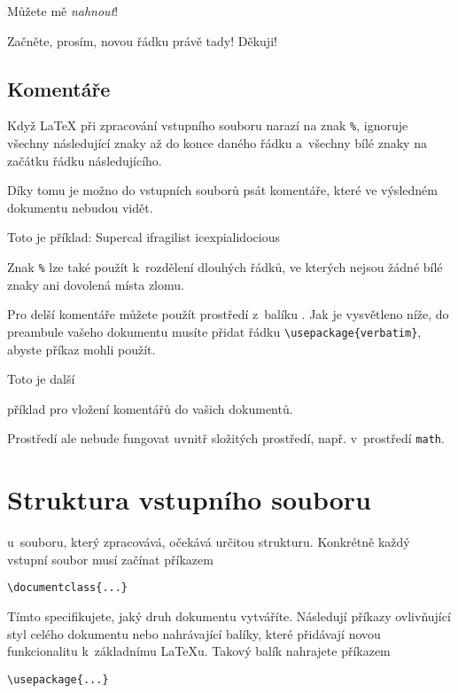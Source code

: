 \begin{example}
Můžete mě \textsl{nahnout}!
\end{example}
\begin{example}
Začněte, prosím, novou řádku
právě tady!\newline
Děkuji!
\end{example}

\subsection{Komentáře}

Když \LaTeX{} při zpracování vstupního souboru narazí na znak \verb|%|,
ignoruje všechny následující znaky až do konce daného řádku
a~všechny bílé znaky na začátku řádku následujícího.

Díky tomu je možno do vstupních souborů psát komentáře, které ve výsledném
dokumentu nebudou vidět.

\begin{example}
Toto je %
příklad: Supercal%
              ifragilist%
    icexpialidocious
\end{example}

Znak \texttt{\%} lze také použít k~rozdělení dlouhých řádků, ve kterých
nejsou žádné bílé znaky ani dovolená místa zlomu.

Pro delší komentáře můžete použít prostředí  z~balíku
. Jak je vysvětleno níže, do preambule vašeho dokumentu 
musíte přidat řádku \verb|\usepackage{verbatim}|, abyste příkaz 
mohli použít.

\begin{example}
Toto je další
\begin{comment}
celkem stupidní,
ale přesto užitečný
\end{comment}
příklad pro vložení
komentářů do vašich dokumentů.
\end{example}

Prostředí  ale nebude fungovat uvnitř složitých prostředí, např. v~prostředí \verb|math|.

\section{Struktura vstupního souboru}

\LaTeXe{} u~souboru, který zpracovává, očekává určitou strukturu.
Konkrétně každý vstupní soubor musí začínat příkazem
\begin{code}
\verb|\documentclass{...}|
\end{code}
Tímto specifikujete, jaký druh dokumentu vytváříte. Následují příkazy
ovlivňující styl celého dokumentu nebo nahrávající balíky, které
přidávají novou funkcionalitu k~základnímu \LaTeX u. Takový balík
nahrajete příkazem
\begin{code}
\verb|\usepackage{...}|
\end{code}

